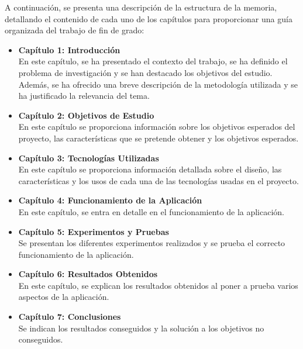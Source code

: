\documentclass[a4paper, 12pt]{book}
\begin{document}
A continuación, se presenta una descripción de la estructura de la memoria, detallando el contenido de cada uno de los capítulos para 
proporcionar una guía organizada del trabajo de fin de grado:

\begin{itemize}
  \item \textbf{Capítulo 1: Introducción} \\
  En este capítulo, se ha presentado el contexto del trabajo, se ha definido el problema de investigación y se han destacado los objetivos del estudio. Además, se ha ofrecido una breve descripción de la metodología utilizada y se ha justificado la relevancia del tema.
  \item \textbf{Capítulo 2: Objetivos de Estudio} \\
  En este capítulo se proporciona información sobre los objetivos esperados del proyecto, las características que se pretende obtener y los objetivos esperados.  
  \item \textbf{Capítulo 3: Tecnologías Utilizadas} \\
  En este capítulo se proporciona información detallada sobre el diseño, las características y los usos de cada una de las tecnologías usadas en el proyecto.
  \item \textbf{Capítulo 4: Funcionamiento de la Aplicación} \\
  En este capítulo, se entra en detalle en el funcionamiento de la aplicación.
  \item \textbf{Capítulo 5: Experimentos y Pruebas} \\
  Se presentan los diferentes experimentos realizados y se prueba el correcto funcionamiento de la aplicación.
  \item \textbf{Capítulo 6: Resultados Obtenidos} \\
  En este capítulo, se explican los resultados obtenidos al poner a prueba varios aspectos de la aplicación.
  \item \textbf{Capítulo 7: Conclusiones} \\
  Se indican los resultados conseguidos y la solución a los objetivos no conseguidos.
\end{itemize}


\cleardoublepage %
\end{document}
